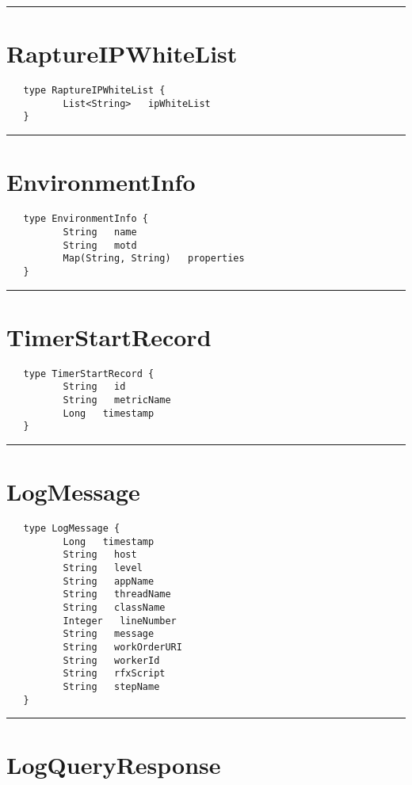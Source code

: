 \rule{15cm}{2pt}
\section{RaptureIPWhiteList}
\label{type:RaptureIPWhiteList}

\begin{verbatim}
   type RaptureIPWhiteList {
          List<String>   ipWhiteList
   }
\end{verbatim}

\rule{15cm}{2pt}
\section{EnvironmentInfo}
\label{type:EnvironmentInfo}

\begin{verbatim}
   type EnvironmentInfo {
          String   name
          String   motd
          Map(String, String)   properties
   }
\end{verbatim}

\rule{15cm}{2pt}
\section{TimerStartRecord}
\label{type:TimerStartRecord}

\begin{verbatim}
   type TimerStartRecord {
          String   id
          String   metricName
          Long   timestamp
   }
\end{verbatim}

\rule{15cm}{2pt}
\section{LogMessage}
\label{type:LogMessage}

\begin{verbatim}
   type LogMessage {
          Long   timestamp
          String   host
          String   level
          String   appName
          String   threadName
          String   className
          Integer   lineNumber
          String   message
          String   workOrderURI
          String   workerId
          String   rfxScript
          String   stepName
   }
\end{verbatim}

\rule{15cm}{2pt}
\section{LogQueryResponse}
\label{type:LogQueryResponse}

